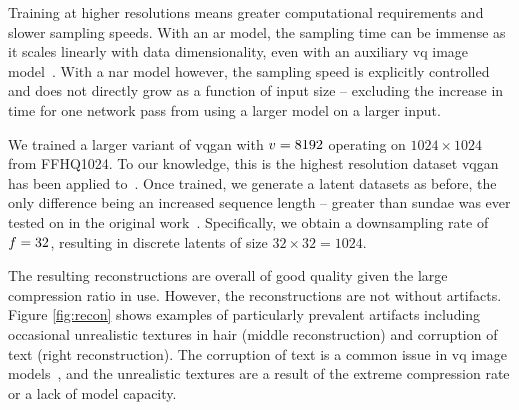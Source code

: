 Training at higher resolutions means greater computational requirements and
slower sampling speeds. With an \gls{ar} model, the sampling time can be
immense as it scales linearly with data dimensionality, even with an auxiliary
\gls{vq} image model~\cite{esser2021taming}. With a \gls{nar} model however, the
sampling speed is explicitly controlled and does not directly grow as a function
of input size -- excluding the increase in time for one network pass from using
a larger model on a larger input.

We trained a larger variant of \gls{vqgan} with $v = 8192$ operating on
$1024 \times 1024$ from FFHQ1024. To our knowledge, this is the highest resolution
dataset \gls{vqgan} has been applied to~\cite{esser2021taming}. Once trained,
we generate a latent datasets as before, the only difference being an increased
sequence length -- greater than \gls{sundae} was ever tested on in the original
work~\cite{savinov2022stepunrolled}. Specifically, we obtain a downsampling rate
of $f=32$, resulting in discrete latents of size $32 \times 32 =
1024$.

The resulting reconstructions are overall of good quality given the large
compression ratio in use. However, the reconstructions are not without
artifacts. Figure \ref{fig:recon} shows examples of particularly prevalent
artifacts including occasional unrealistic textures in hair (middle
reconstruction) and corruption of text (right reconstruction). The corruption of
text is a common issue in \gls{vq} image models~\cite{ramesh2021dalle}, and the
unrealistic textures are a result of the extreme compression rate or a lack of
model capacity.

